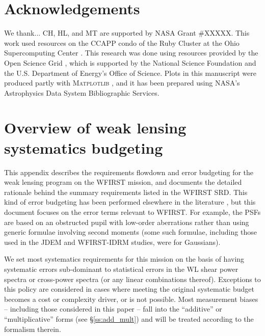 \documentclass[aps,prd, amsmath,amssymb,superscriptaddress,showkeys,nofootinbib,reprint,preprintnumbers]{revtex4-1}
\begin{document}
\section*{Acknowledgements}

We thank...
CH, HL, and MT are supported by NASA Grant \#XXXXX.  
This work used resources on the CCAPP condo of the Ruby Cluster at the Ohio Supercomputing Center \cite{OhioSupercomputerCenter1987}. This research was done using resources provided by the Open Science Grid \cite{Pordes2008,Sfiligoi2009}, which is supported by the National Science Foundation and the U.S. Department of Energy's Office of Science. Plots in this manuscript were produced partly with \textsc{Matplotlib} \cite{Hunter:2007}, and it has been prepared using NASA's Astrophysics Data System Bibliographic Services.

\appendix


\section{Overview of weak lensing systematics budgeting}
\label{app:wl-budget}

This appendix describes the requirements flowdown and error budgeting
for the weak lensing program on the WFIRST mission, and documents the
detailed rationale behind the summary requirements listed in the
WFIRST SRD. This kind of error budgeting has been performed elsewhere
in the literature \cite{2008A&A...484...67P,2013MNRAS.429..661M}, but
this document focuses on the error terms relevant to WFIRST. For
example, the PSFs are based on an obstructed pupil with low-order
aberrations rather than using generic formulae involving second
moments (some such formulae, including those used in the JDEM and
WFIRST-IDRM studies, were for Gaussians).

We set most systematics requirements for this mission on the basis of
having systematic errors sub-dominant to statistical errors in the WL
shear power spectra or cross-power spectra (or any linear combinations
thereof). Exceptions to this policy are considered in cases
where meeting the original systematic budget becomes a cost or
complexity driver, or is not possible. Most measurement biases -- including those considered in this paper -- fall
into the ``additive'' or ``multiplicative'' forms (see
\S\ref{ss:add_mult}) and will be treated according to the formalism
therein.
\end{document}
